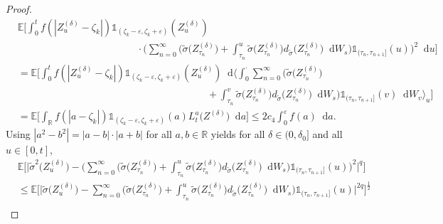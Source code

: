 \documentclass[11pt,a4paper]{article}
\numberwithin{equation}{section}
\theoremstyle{definition}
\newcommand{\E}{{\mathbb{E}}}
\newcommand{\R}{{\mathbb{R}}}
\newcommand{\diff}{\mathop{}\!\mathrm{d}}
\begin{document}
\begin{proof}
\begin{equation}\label{pOTE21}
    \begin{aligned}
    &\E\Big[\int_0^t f(|Z^{(\delta)}_{u}-\zeta_k|)\mathds{1}_{(\zeta_k-\varepsilon, \zeta_k+\varepsilon)}(Z^{(\delta)}_{u})\\
    &\quad\quad\quad\quad \quad\quad\quad\quad \quad\quad\quad\quad \cdot \Big(\sum_{n=0}^{\infty} \Big( \widetilde\sigma \big(Z^{(\delta)}_{\tau_n}\big) + \int_{\tau_n}^u \widetilde\sigma \big(Z^{(\delta)}_{\tau_n}\big)d_{\widetilde\sigma} \big(Z^{(\delta)}_{\tau_n}\big)\diff W_s \Big)\mathds{1}_{(\tau_n,\tau_{n+1}]}(u) \Big)^2 \diff u \Big]\\
    &=\E\Big[\int_0^t f(|Z^{(\delta)}_{u}-\zeta_k|)\mathds{1}_{(\zeta_k-\varepsilon, \zeta_k+\varepsilon)}(Z^{(\delta)}_{u}) \diff \Big\langle \int_0^\cdot \sum_{n=0}^{\infty} \Big( \widetilde\sigma \big(Z^{(\delta)}_{\tau_n}\big) \\
    &\quad\quad\quad\quad \quad\quad\quad\quad \quad\quad\quad\quad \quad\quad\quad\quad \quad\quad\quad+ \int_{\tau_n}^v \widetilde\sigma \big(Z^{(\delta)}_{\tau_n}\big)d_{\widetilde\sigma} \big(Z^{(\delta)}_{\tau_n}\big)\diff W_s \Big)\mathds{1}_{(\tau_n,\tau_{n+1}]}(v)\diff W_v\Big\rangle_u\Big]\\
    &=\E\Big[\int_\R f(|a-\zeta_k|)\mathds{1}_{(\zeta_k-\varepsilon, \zeta_k+\varepsilon)}(a) L^a_t \big(Z^{(\delta)}\big) \diff a \Big]
    \leq 2 c_4 \int_0^{\varepsilon} f(a) \diff a.
    \end{aligned}
\end{equation}
Using $|a^2-b^2| = |a-b|\cdot|a+b|$ for all $a,b\in\R$ yields for all $\delta\in(0,\delta_0]$ and all $u\in[0,t]$, 
\begin{equation}\label{pOTE22a}
    \begin{aligned}
    &\E\Big[ \Big| \widetilde\sigma^2\big(Z^{(\delta)}_{u} \big)- \Big(\sum_{n=0}^{\infty} \Big( \widetilde\sigma \big(Z^{(\delta)}_{\tau_n}\big) + \int_{\tau_n}^u \widetilde\sigma \big(Z^{(\delta)}_{\tau_n}\big)d_{\widetilde\sigma} \big(Z^{(\delta)}_{\tau_n}\big)\diff W_s \Big)\mathds{1}_{(\tau_n,\tau_{n+1}]}(u) \Big)^2\Big|^q\Big]\\
    &\leq\E\Big[\Big| \widetilde\sigma\big(Z^{(\delta)}_{u} \big)- \sum_{n=0}^{\infty} \Big( \widetilde\sigma \big(Z^{(\delta)}_{\tau_n}\big) + \int_{\tau_n}^u \widetilde\sigma \big(Z^{(\delta)}_{\tau_n}\big)d_{\widetilde\sigma} \big(Z^{(\delta)}_{\tau_n}\big)\diff W_s \Big)\mathds{1}_{(\tau_n,\tau_{n+1}]}(u) \Big|^{2q}\Big]^{\frac{1}{2}}\\

\end{aligned}
\end{equation}
\end{proof}
\end{document}

